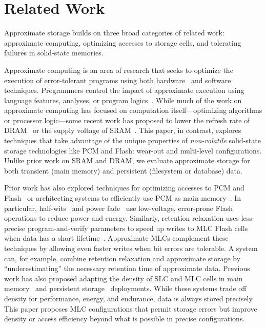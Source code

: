 \documentclass[prodmode,acmtocs]{acmsmall}
\begin{document}
\section{Related Work}
\label{sec:related}

Approximate storage builds on three broad categories of related work:
approximate computing, optimizing accesses to storage
cells, and tolerating failures in solid-state memories.

Approximate computing is an area of research that seeks to optimize the
execution of error-tolerant programs using both
hardware~\cite{flikker,truffle,npu,relax,pcmos,stochasticproc} and software~\cite{green,perforation,dynamicknobs} techniques. Programmers control the impact of approximate execution using language features, analyses, or program
logics~\cite{enerj,relax,carbin_pldi12,rely}. While much of the work on
approximate computing has focused on computation itself---optimizing algorithms
or processor logic---some recent work has proposed to lower the refresh rate of
DRAM~\cite{flikker} or the supply voltage of SRAM~\cite{truffle,hybridsram,sramerrors}. This paper, in contrast, explores techniques that take advantage
of the unique properties of \emph{non-volatile} solid-state storage
technologies like PCM and Flash: wear-out and multi-level configurations.
Unlike prior work on SRAM and DRAM, we evaluate approximate storage for both
transient (main memory) and persistent (filesystem or database) data.

Prior work has also explored techniques for optimizing accesses to PCM and
Flash~\cite{writecancel,improvingwrites} or architecting systems to
efficiently use PCM as main
memory~\cite{durable-pcm-mm,pcm-dram-alt,ecp,drm,qureshi-pcm-mm}. In particular, half-wits~\cite{halfwits} and
power fade~\cite{powerfade} use low-voltage, error-prone
Flash operations to reduce power and energy.
Similarly, retention relaxation uses less-precise program-and-verify parameters to
speed up writes to MLC Flash cells when data has a short
lifetime~\cite{flash-retention-relax}. Approximate MLCs complement these
techniques by allowing even faster writes when bit errors are tolerable. A
system can, for example, combine retention relaxation and approximate storage
by ``underestimating'' the necessary retention time of approximate data.
%
Previous work has also proposed adapting the density of SLC and MLC cells in main
memory~\cite{morphablepcm} and persistent storage~\cite{adams} deployments.
While these systems trade off density for performance, energy, and endurance,
data is always stored precisely. This paper proposes MLC
configurations that permit storage errors but improve density or access
efficiency beyond what is possible in precise configurations.
\end{document}
